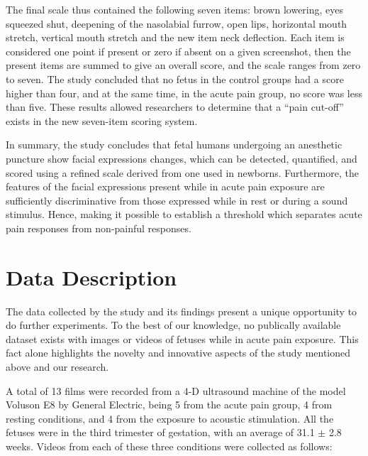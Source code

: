 The final scale thus contained the following seven items: brown lowering, eyes squeezed shut, deepening of the nasolabial furrow, open lips, horizontal mouth stretch, vertical mouth stretch and the new item neck deflection. Each item is considered one point if present or zero if absent on a given screenshot, then the present items are summed to give an overall score, and the scale ranges from zero to seven. The study concluded that no fetus in the control groups had a score higher than four, and at the same time, in the acute pain group, no score was less than five. These results allowed researchers to determine that a ``pain cut-off'' exists in the new seven-item scoring system.

In summary, the study concludes that fetal humans undergoing an anesthetic puncture show facial expressions changes, which can be detected, quantified, and scored using a refined scale derived from one used in newborns. Furthermore, the features of the facial expressions present while in acute pain exposure are sufficiently discriminative from those expressed while in rest or during a sound stimulus. Hence, making it possible to establish a threshold which separates acute pain responses from non-painful responses.

\section{Data Description}

The data collected by the study and its findings present a unique opportunity to do further experiments. To the best of our knowledge, no publically available dataset exists with images or videos of fetuses while in acute pain exposure. This fact alone highlights the novelty and innovative aspects of the study mentioned above and our research.

A total of 13 films were recorded from a 4-D ultrasound machine of the model Voluson E8 by General Electric, being 5 from the acute pain group, 4 from resting conditions, and 4 from the exposure to acoustic stimulation. All the fetuses were in the third trimester of gestation, with an average of 31.1 $\pm$ 2.8 weeks.  Videos from each of these three conditions were collected as follows:

